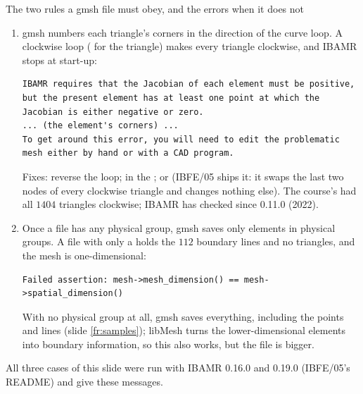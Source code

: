 \documentclass[aspectratio=169,11pt]{beamer}
\begin{document}
\begin{frame}[fragile]{The two rules a gmsh file must obey, and the errors when it does not}
\label{fr:tworules}
\scriptsize
\begin{enumerate}
  \item {} gmsh numbers each triangle's corners in the direction of the curve loop. A clockwise loop ( for the triangle) makes every triangle clockwise, and IBAMR stops at start-up:
\begin{lstlisting}[style=datatiny]
IBAMR requires that the Jacobian of each element must be positive, but the present element has at least one point at which the Jacobian is either negative or zero.
... (the element's corners) ...
To get around this error, you will need to edit the problematic mesh either by hand or with a CAD program.
\end{lstlisting}
  Fixes: reverse the loop;  in the ; or  (IBFE/05 ships it: it swaps the last two nodes of every clockwise triangle and changes nothing else). The course's  had all $1404$ triangles clockwise; IBAMR has checked since 0.11.0 (2022).
  \item {} Once a file has any physical group, gmsh saves only elements in physical groups. A file with only a  holds the $112$ boundary lines and no triangles, and the mesh is one-dimensional:
\begin{lstlisting}[style=datatiny]
Failed assertion: mesh->mesh_dimension() == mesh->spatial_dimension()
\end{lstlisting}
  With no physical group at all, gmsh saves everything, including the points and lines (slide \ref{fr:samples}); libMesh turns the lower-dimensional elements into boundary information, so this also works, but the file is bigger.
\end{enumerate}
All three cases of this slide were run with IBAMR 0.16.0 and 0.19.0 (IBFE/05's README) and give these messages.
\end{frame}
\end{document}
